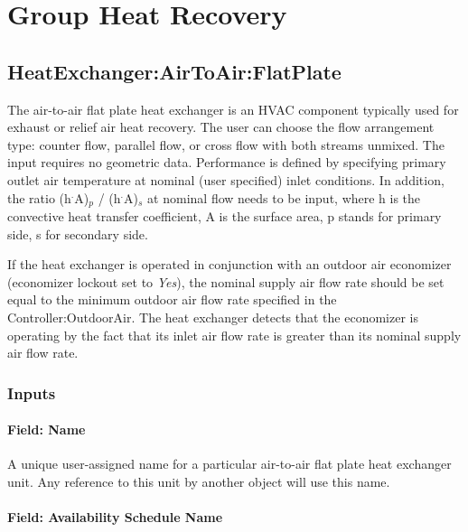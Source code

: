 \section{Group Heat Recovery}\label{group-heat-recovery}

\subsection{HeatExchanger:AirToAir:FlatPlate}\label{heatexchangerairtoairflatplate}

The air-to-air flat plate heat exchanger is an HVAC component typically used for exhaust or relief air heat recovery. The user can choose the flow arrangement type: counter flow, parallel flow, or cross flow with both streams unmixed. The input requires no geometric data. Performance is defined by specifying primary outlet air temperature at nominal (user specified) inlet conditions. In addition, the ratio (h\(^{.}\)A)\(_{p}\) / (h\(^{.}\)A)\(_{s}\) at nominal flow needs to be input, where h is the convective heat transfer coefficient, A is the surface area, p stands for primary side, s for secondary side.

If the heat exchanger is operated in conjunction with an outdoor air economizer (economizer lockout set to \emph{Yes}), the nominal supply air flow rate should be set equal to the minimum outdoor air flow rate specified in the Controller:OutdoorAir. The heat exchanger detects that the economizer is operating by the fact that its inlet air flow rate is greater than its nominal supply air flow rate.

\subsubsection{Inputs}\label{inputs-021}

\paragraph{Field: Name}\label{field-name-020}

A unique user-assigned name for a particular air-to-air flat plate heat exchanger unit. Any reference to this unit by another object will use this name.

\paragraph{Field: Availability Schedule Name}\label{field-availability-schedule-name-008}

